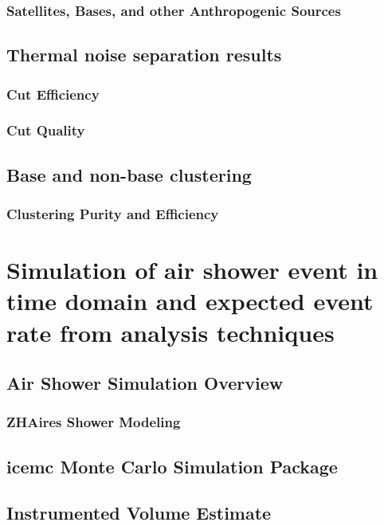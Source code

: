 \documentclass[11pt]{uhthesis}
\begin{document}
	\subsection{Satellites, Bases, and other Anthropogenic Sources}


\section{Thermal noise separation results}
	\subsection{Cut Efficiency}
	
	\subsection{Cut Quality}

\section{Base and non-base clustering}
	\subsection{Clustering Purity and Efficiency}

	

\chapter{Simulation of air shower event in time domain and expected event rate from analysis techniques}
\section{Air Shower Simulation Overview}
	\subsection{ZHAires Shower Modeling}
	
\section{icemc Monte Carlo Simulation Package}
	
\section{Instrumented Volume Estimate}
			
\end{document}
